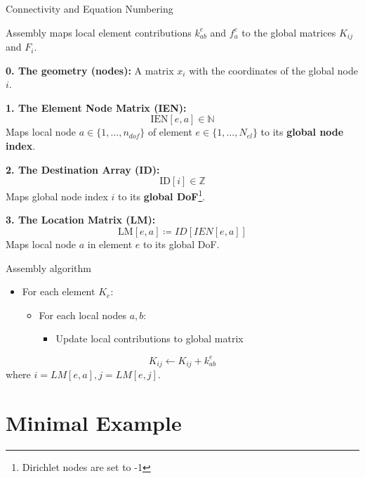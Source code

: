 \documentclass[aspectratio=169]{beamer}
\begin{document}
\begin{frame}{Connectivity and Equation Numbering}
    \begin{footnotesize}
    Assembly maps local element contributions $k^e_{ab}$ and $f^e_a$ to the global matrices $K_{ij}$ and $F_i$. \pause
    
    \vspace{0.3cm}
    \pause\textbf{0. The geometry (nodes):} A matrix $x_i$ with the coordinates of the global node $i$.
    
    \pause\textbf{1. The Element Node Matrix (IEN):}
    $$ \text{IEN}[e, a] \in \mathbb{N} $$
    Maps local node $a \in \{1, \dots, n_{dof}\}$ of element $e \in \{1, \dots, N_{el}\}$ to its \textbf{global node index}.
    
    \vspace{0.3cm}
    \pause\textbf{2. The Destination Array (ID):}
    $$ \text{ID}[i] \in \mathbb{Z} $$
    Maps global node index $i$ to its \textbf{global DoF}\footnote{Dirichlet nodes are set to -1}. 

    \pause\textbf{3. The Location Matrix (LM):}
    $$ \text{LM}[e, a] \coloneqq ID[IEN[e,a]] $$
    Maps local node $a$ in element $e$ to its global DoF.
    \end{footnotesize}

\end{frame}

\begin{frame}{Assembly algorithm}

    \begin{itemize}
        \item For each element $K_e$:
            \begin{itemize}
                \item For each local nodes $a,b$:
                    \begin{itemize}
                            \item Update local contributions to global matrix
                    \end{itemize}
            \end{itemize}
    \end{itemize}
    $$ K_{ij} \leftarrow K_{ij} + k^e_{ab} $$
    where $i = LM[e,a], j = LM[e,j]$. 
\end{frame}

\section{Minimal Example}
\end{document}
